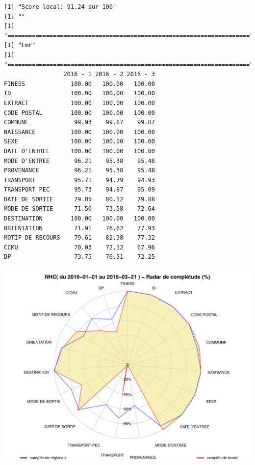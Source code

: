 \documentclass[]{article}
\begin{document}
\begin{verbatim}
[1] "Score local: 91.24 sur 100"
[1] ""
[1] "====================================================================="
[1] "Emr"
[1] "====================================================================="
                 2016 - 1 2016 - 2 2016 - 3
FINESS             100.00   100.00   100.00
ID                 100.00   100.00   100.00
EXTRACT            100.00   100.00   100.00
CODE POSTAL        100.00   100.00   100.00
COMMUNE             99.93    99.87    99.87
NAISSANCE          100.00   100.00   100.00
SEXE               100.00   100.00   100.00
DATE D'ENTREE      100.00   100.00   100.00
MODE D'ENTREE       96.21    95.38    95.48
PROVENANCE          96.21    95.38    95.48
TRANSPORT           95.71    94.79    94.93
TRANSPORT PEC       95.73    94.87    95.09
DATE DE SORTIE      79.85    80.12    79.88
MODE DE SORTIE      71.50    73.58    72.64
DESTINATION        100.00   100.00   100.00
ORIENTATION         71.91    76.62    77.93
MOTIF DE RECOURS    79.61    82.38    77.32
CCMU                70.03    72.12    67.96
DP                  73.75    76.51    72.25
\end{verbatim}

\includegraphics{completude_files/figure-latex/finess-4.pdf}
\end{document}
